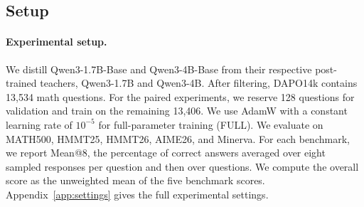\subsection{Setup}

\paragraph{Experimental setup.}
We distill Qwen3-1.7B-Base and Qwen3-4B-Base from their respective
post-trained teachers, Qwen3-1.7B and Qwen3-4B. After filtering,
DAPO14k contains 13,534 math questions. For the paired experiments,
we reserve 128 questions for validation and train on the remaining
13,406. We use AdamW with a constant learning rate of $10^{-5}$ for
full-parameter training (FULL). We evaluate on MATH500, HMMT25,
HMMT26, AIME26, and Minerva. For each benchmark, we report Mean@8,
the percentage of correct answers averaged over eight sampled responses
per question and then over questions. We compute the overall score
as the unweighted mean of the five benchmark scores.
Appendix~\ref{app:settings} gives the full experimental settings.